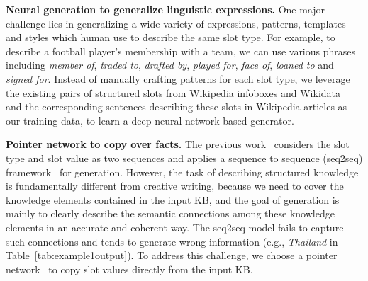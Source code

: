 \documentclass[11pt,a4paper]{article}
\begin{document}
\begin{table*}[!htb]
\begin{tabularx}{\linewidth}{|>{\hsize=.3\hsize}X|>{\hsize=1.7\hsize}X|}
\end{tabularx}
\vspace{-2mm}
\caption{Human and System Generated Descriptions about the KB in Table~\ref{tab:example1input}
\label{tab:example1output}}
\vspace{-2mm}
\end{table*}


\textbf{Neural generation to generalize linguistic expressions.} One major challenge lies in generalizing a wide variety of expressions, patterns, templates and styles which human use to describe the same slot type. For example, to describe a football player's membership with a team, we can use various phrases including \emph{member of}, \emph{traded to}, \emph{drafted by}, \emph{played for}, \emph{face of}, \emph{loaned to} and \emph{signed for}. Instead of manually crafting patterns for each slot type, we leverage the existing pairs of structured slots from Wikipedia infoboxes and Wikidata~\cite{wiki} and the corresponding sentences describing these slots in Wikipedia articles as our training data, to learn a deep neural network based generator.




\textbf{Pointer network to copy over facts.} The previous work~\cite{table2text17} considers the slot type and slot value as two sequences and applies a sequence to sequence (seq2seq) framework~\cite{cho2014learning} for generation. 
However, the task of describing structured knowledge is fundamentally different from creative writing, because we need to cover 
the knowledge elements contained in the input KB, and the goal of generation is mainly to clearly describe the semantic connections among these knowledge elements in an accurate and coherent way. 
The seq2seq model fails to capture such connections and tends to generate wrong information (e.g., \emph{Thailand} in Table~\ref{tab:example1output}).
To address this challenge, we choose a pointer network~\citep{hybridp17} to copy slot values directly from the input KB.
\end{document}
